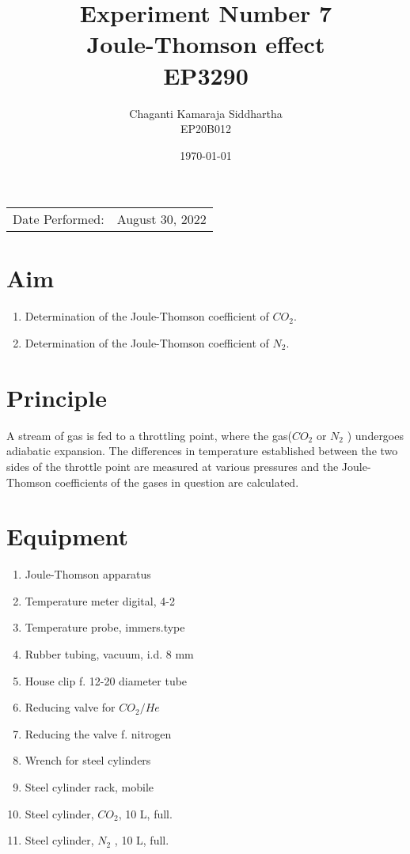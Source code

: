 \documentclass[
	letterpaper, %
	10pt, %
]{CSUniSchoolLabReport}
\title{Experiment Number 7\\Joule-Thomson effect\\ EP3290} %
\author{Chaganti Kamaraja Siddhartha\\EP20B012} %
\date{\today} %
\begin{document}
\maketitle %

\begin{center}
	\begin{tabular}{l r}
		Date Performed: & August 30, 2022 \\ %
	\end{tabular}
\end{center}


\section{Aim}
\begin{enumerate}
	\item  Determination of the Joule-Thomson coefficient of \(CO_2\).
	\item  Determination of the Joule-Thomson coefficient of \(N_2\).
\end{enumerate} 
\section{Principle}
A stream of gas is fed to a throttling point, where the gas(\(CO_2\) or \(N_2\) ) undergoes adiabatic expansion. The differences in temperature established between the two sides of the throttle point are measured at various pressures and the Joule-Thomson coefficients of the gases in question are calculated. 
\section{Equipment}
\begin{enumerate}
	\item Joule-Thomson apparatus
	\item Temperature meter digital, 4-2
	\item Temperature probe, immers.type 
	\item Rubber tubing, vacuum, i.d. 8 mm
	\item House clip f. 12-20 diameter tube 
	\item Reducing valve for \(CO_2 / He\) 
	\item Reducing the valve f. nitrogen
	\item Wrench for steel cylinders
	\item Steel cylinder rack, mobile 
	\item Steel cylinder, \(CO_2\), 10 L, full. 
	\item Steel cylinder, \(N_2\) , 10 L, full. 
\end{enumerate}
\end{document}

